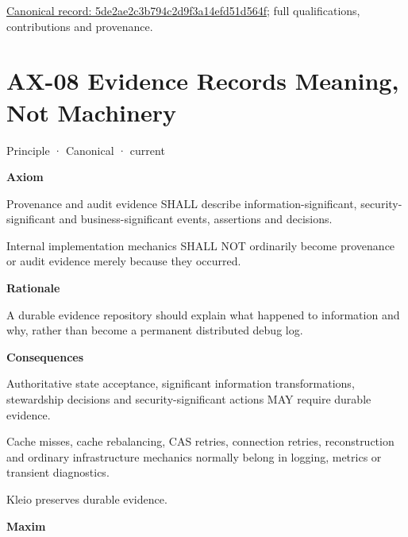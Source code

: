 {\footnotesize \href{../../../../continuum/motivation/principle/5de2ae2c3b794c2d9f3a14efd51d564f.md}{Canonical record: 5de2ae2c3b794c2d9f3a14efd51d564f}; full qualifications, contributions and provenance.}\par
\section{AX-08 Evidence Records Meaning, Not Machinery}

\label{element:21d6864657964ba5b03e3f6b5eb29cd5}
{\small Principle · Canonical · current}\par

\par\medskip\textbf{Axiom}\par


Provenance and audit evidence SHALL describe information-significant,
security-significant and business-significant events, assertions and
decisions.



Internal implementation mechanics SHALL NOT ordinarily become provenance
or audit evidence merely because they occurred.



\par\medskip\textbf{Rationale}\par


A durable evidence repository should explain what happened to
information and why, rather than become a permanent distributed debug
log.



\par\medskip\textbf{Consequences}\par


Authoritative state acceptance, significant information transformations,
stewardship decisions and security-significant actions MAY require
durable evidence.



Cache misses, cache rebalancing, CAS retries, connection retries,
reconstruction and ordinary infrastructure mechanics normally belong in
logging, metrics or transient diagnostics.



Kleio preserves durable evidence.



\par\medskip\textbf{Maxim}\par


